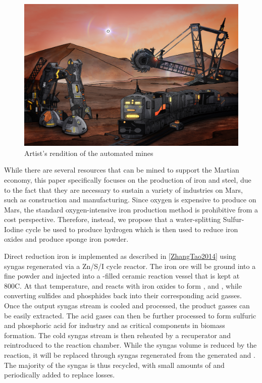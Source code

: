 \documentclass[fleqn,10pt]{Stylesheet} %
\begin{document}
\begin{figure}
    \centering
    \includegraphics[width=\linewidth]{art/mining.jpg}
    \caption{Artist's rendition of the automated mines}
    \label{fig:mines}
\end{figure}

While there are several resources that can be mined to support the Martian economy, this paper specifically focuses on the production of iron and steel, due to the fact that they are necessary to sustain a variety of industries on Mars, such as construction and manufacturing. Since oxygen is expensive to produce on Mars, the standard oxygen-intensive iron production method  is prohibitive from a cost perspective. Therefore, instead, we propose that a water-splitting  Sulfur-Iodine cycle be used to produce hydrogen which is then used to reduce iron oxides and produce sponge iron powder.

Direct reduction iron is implemented as described in \ref{ZhangTao2014} using syngas regenerated via a Zn/S/I cycle reactor. The iron ore will be ground into a fine powder and injected into a -filled ceramic reaction vessel that is kept at 800\degree{}C. At that temperature,  and  reacts with iron oxides to form ,  and , while converting sulfides and phosphides back into their corresponding acid gasses. Once the output syngas stream is cooled and processed, the product gasses can be easily extracted. The acid gases can then be further processed to form sulfuric and phosphoric acid for industry and as critical components in biomass formation. The cold syngas stream is then reheated by a recuperator and reintroduced to the reaction chamber. While the syngas volume is reduced by the reaction, it will be replaced through syngas regenerated from the generated  and . The majority of the syngas is thus recycled, with small amounts of  and  periodically added to replace losses.
\end{document}
